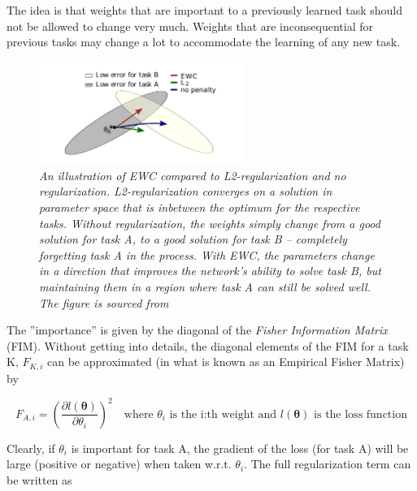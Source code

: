 \documentclass{article}
\begin{document}
        The idea is that weights that are important to a previously learned task
        should not be allowed to change very much. Weights that are 
        inconsequential for previous tasks may change a lot to accommodate the 
        learning of any new task. 

        \begin{figure}[H]
            \centering
            \includegraphics[width=0.6\textwidth]{figures/ewc_illustration.png}
            \caption{\textit{An illustration of EWC compared to L2-regularization and 
            no regularization. L2-regularization converges on a solution 
            in parameter space that is inbetween the optimum for the respective
            tasks. Without regularization, the weights simply change from 
            a good solution for task A, to a good solution for task B -- 
            completely forgetting task A in the process. With EWC, the parameters
            change in a direction that improves the network's ability to solve 
            task B, but maintaining them in a region where task A can still be 
            solved well. The figure is sourced from \cite{kirkpatrick2017overcoming}}}
        \end{figure}
        
        
        The ''importance'' is given by the diagonal 
        of the \textit{Fisher Information Matrix} (FIM). Without getting into 
        details, the diagonal elements of the FIM for a task K, $F_{K,i}$ can be
        approximated (in what is known as an Empirical Fisher Matrix) by 

        \begin{equation*}
            F_{A,i} = \left(\frac{\partial l(\boldsymbol{\theta})}{\partial \theta_i}\right)^2\quad
            \text{where $\theta_i$ is the i:th weight and $l(\boldsymbol{\theta})$ is the loss function}
        \end{equation*}
        
        Clearly, if $\theta_i$ is important for task A, the gradient of the loss
        (for task A) will be large (positive or negative) when taken w.r.t. 
        $\theta_i$. The full regularization term can be written as 
\end{document}

